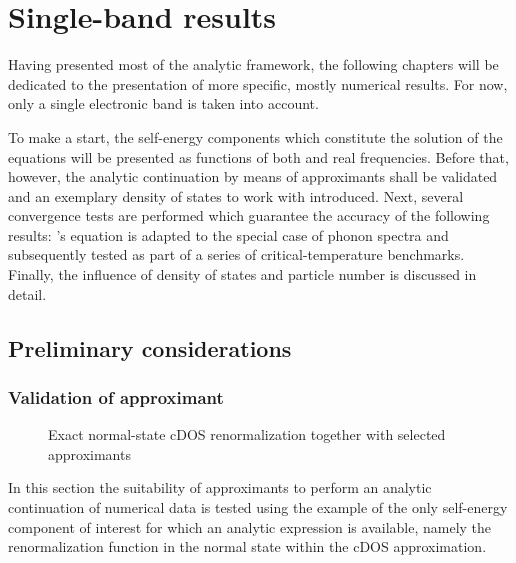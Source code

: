 
\chapter{Single-band results}

Having presented most of the analytic framework, the following chapters will be
dedicated to the presentation of more specific, mostly numerical results. For
now, only a single electronic band is taken into account.

To make a start, the self-energy components which constitute the solution of the
 equations will be presented as functions of both
 and real frequencies. Before that, however, the analytic
continuation by means of  approximants shall be validated and an
exemplary density of states to work with introduced. Next, several convergence
tests are performed which guarantee the accuracy of the following results:
's equation is adapted to the special case of 
phonon spectra and subsequently tested as part of a series of
critical-temperature benchmarks. Finally, the influence of density of states and
particle number is discussed in detail.

\section{Preliminary considerations}

\subsection{Validation of  approximant}

\begin{figure}
    
    
    \caption{Exact normal-state cDOS renormalization together with selected
              approximants}
    \label{validation Pade}
\end{figure}
%
In this section the suitability of  approximants to perform an
analytic continuation of numerical data is tested using the example of the only
self-energy component of interest for which an analytic expression is available,
namely the renormalization function in the normal state within the cDOS
approximation.

